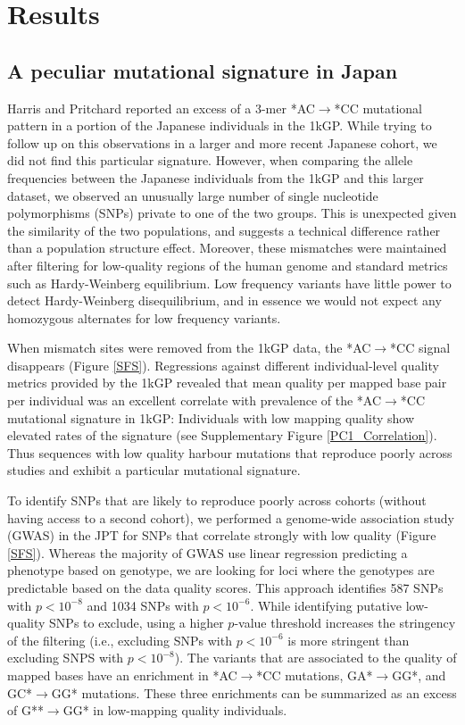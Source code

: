 \documentclass[9pt,lineno]{elife}
\begin{document}
			\section{Results}
	\subsection{A peculiar mutational signature in Japan}			
	
Harris and Pritchard reported an excess of a 3-mer *AC${\rightarrow}$*CC mutational pattern in a portion of the Japanese individuals in the 1kGP.\citep{Harris2015a}
While trying to follow up on this observations in a larger and more recent Japanese cohort, we did not find this particular signature.
However, when comparing the allele frequencies between the Japanese individuals from the 1kGP and this larger dataset, we observed an unusually large number of single nucleotide polymorphisms (SNPs) private to one of the two groups.
This is unexpected given the similarity of the two populations, and suggests a technical difference rather than a population structure effect. 
Moreover, these mismatches were maintained after filtering for low-quality regions of the human genome and standard metrics such as Hardy-Weinberg equilibrium.
Low frequency variants have little power to detect Hardy-Weinberg disequilibrium, and in essence we would not expect any homozygous alternates for low frequency variants. 

When mismatch sites were removed from the 1kGP data, the  *AC${\rightarrow}$*CC signal disappears (Figure \ref{SFS}).
Regressions against different individual-level quality metrics provided by the 1kGP revealed that mean quality per mapped base pair per individual was an excellent correlate with prevalence of the  *AC${\rightarrow}$*CC mutational signature in 1kGP:
Individuals with low mapping quality show elevated rates of the signature (see Supplementary Figure \ref{PC1_Correlation}).
Thus sequences with low quality harbour mutations that reproduce poorly across studies and exhibit a particular mutational signature. 

To identify SNPs that are likely to reproduce poorly across cohorts (without having access to a second cohort), we performed a genome-wide association study (GWAS) in the JPT for SNPs that correlate strongly with low quality (Figure \ref{SFS}).
Whereas the majority of GWAS use linear regression predicting a phenotype based on genotype, we are looking for loci where the genotypes are predictable based on the data quality scores.
This approach identifies 587 SNPs with $p < 10^{-8}$ and 1034 SNPs with $ p < 10^{-6}$.
While identifying putative low-quality SNPs to exclude, using a higher $p$-value threshold increases the stringency of the filtering (i.e., excluding SNPs with $ p < 10^{-6}$ is more stringent than excluding SNPS with $p < 10^{-8}$). 
The variants that are associated to the quality of mapped bases have an enrichment in *AC${\rightarrow}$*CC mutations, GA*${\rightarrow}$GG*, and GC*${\rightarrow}$GG* mutations.
These three enrichments can be summarized as an excess of G**${\rightarrow}$GG* in low-mapping quality individuals.
\end{document}
